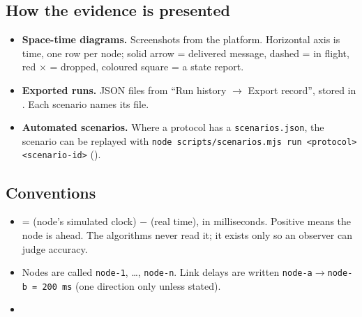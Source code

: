 
\subsection{How the evidence is presented}
\begin{itemize}[itemsep=2pt]
  \item \textbf{Space-time diagrams.} Screenshots from the platform. Horizontal axis
        is time, one row per node; solid arrow = delivered message, dashed = in flight,
        red $\times$ = dropped, coloured square = a  state report.
  \item \textbf{Exported runs.} JSON files from ``Run history $\rightarrow$ Export record'',
        stored in . Each scenario names its file.
  \item \textbf{Automated scenarios.} Where a protocol has a \nolinkurl{scenarios.json},
        the scenario can be replayed with
        \texttt{node scripts/scenarios.mjs run <protocol> <scenario-id>}
        ().
\end{itemize}

\subsection{Conventions}
\begin{itemize}[itemsep=2pt]
  \item {} = (node's simulated clock) $-$ (real time), in milliseconds.
        Positive means the node is ahead. The algorithms never read it; it exists only
        so an observer can judge accuracy.
  \item Nodes are called \texttt{node-1}, \dots, \texttt{node-n}. Link delays are written
        \texttt{node-a$\to$node-b = 200\,ms} (one direction only unless stated).
  \item {}
\end{itemize}
